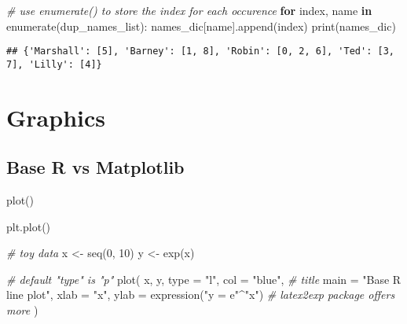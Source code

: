 \documentclass[
]{book}
\newenvironment{Shaded}{\begin{snugshade}}{\end{snugshade}}
\newcommand{\AttributeTok}[1]{\textcolor[rgb]{0.77,0.63,0.00}{#1}}
\newcommand{\BuiltInTok}[1]{#1}
\newcommand{\CommentTok}[1]{\textcolor[rgb]{0.56,0.35,0.01}{\textit{#1}}}
\newcommand{\ControlFlowTok}[1]{\textcolor[rgb]{0.13,0.29,0.53}{\textbf{#1}}}
\newcommand{\DecValTok}[1]{\textcolor[rgb]{0.00,0.00,0.81}{#1}}
\newcommand{\FunctionTok}[1]{\textcolor[rgb]{0.00,0.00,0.00}{#1}}
\newcommand{\KeywordTok}[1]{\textcolor[rgb]{0.13,0.29,0.53}{\textbf{#1}}}
\newcommand{\NormalTok}[1]{#1}
\newcommand{\OtherTok}[1]{\textcolor[rgb]{0.56,0.35,0.01}{#1}}
\newcommand{\SpecialCharTok}[1]{\textcolor[rgb]{0.00,0.00,0.00}{#1}}
\newcommand{\StringTok}[1]{\textcolor[rgb]{0.31,0.60,0.02}{#1}}
\begin{document}
\begin{Shaded}
\begin{Highlighting}[]
\CommentTok{\# use enumerate() to store the index for each occurence}
\ControlFlowTok{for}\NormalTok{ index, name }\KeywordTok{in} \BuiltInTok{enumerate}\NormalTok{(dup\_names\_list):}
\NormalTok{  names\_dic[name].append(index)}
\BuiltInTok{print}\NormalTok{(names\_dic)}
\end{Highlighting}
\end{Shaded}

\begin{verbatim}
## {'Marshall': [5], 'Barney': [1, 8], 'Robin': [0, 2, 6], 'Ted': [3, 7], 'Lilly': [4]}
\end{verbatim}

\hypertarget{graphics}{%
\chapter{Graphics}\label{graphics}}

\hypertarget{base-r-vs-matplotlib}{%
\section{Base R vs Matplotlib}\label{base-r-vs-matplotlib}}

plot()

plt.plot()

\begin{Shaded}
\begin{Highlighting}[]
\CommentTok{\# toy data}
\NormalTok{x }\OtherTok{\textless{}{-}} \FunctionTok{seq}\NormalTok{(}\DecValTok{0}\NormalTok{, }\DecValTok{10}\NormalTok{)}
\NormalTok{y }\OtherTok{\textless{}{-}} \FunctionTok{exp}\NormalTok{(x)}
\end{Highlighting}
\end{Shaded}

\begin{Shaded}
\begin{Highlighting}[]
\CommentTok{\# default "type" is "p"}
\FunctionTok{plot}\NormalTok{(}
\NormalTok{  x, y,}
  \AttributeTok{type =} \StringTok{"l"}\NormalTok{,}
  \AttributeTok{col =} \StringTok{"blue"}\NormalTok{,}
  \CommentTok{\# title}
  \AttributeTok{main =} \StringTok{"Base R line plot"}\NormalTok{,}
  \AttributeTok{xlab =} \StringTok{"x"}\NormalTok{,}
  \AttributeTok{ylab =} \FunctionTok{expression}\NormalTok{(}\StringTok{"y = e"}\SpecialCharTok{\^{}}\StringTok{"x"}\NormalTok{)}
  \CommentTok{\# latex2exp package offers more}
\NormalTok{)}
\end{Highlighting}
\end{Shaded}
\end{document}
